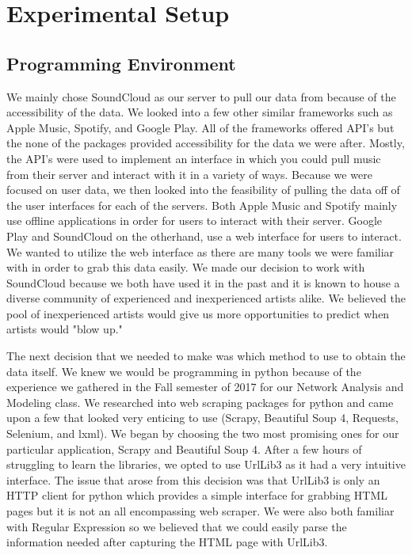 \documentclass{article}
\begin{document}
\section{Experimental Setup}
\subsection{Programming Environment}
We mainly chose SoundCloud as our server to pull our data from because of the accessibility of the data.  We looked into a few other similar frameworks such as Apple Music, Spotify, and Google Play.  All of the frameworks offered API's but the none of the packages provided accessibility for the data we were after.  Mostly, the API's were used to implement an interface in which you could pull music from their server and interact with it in a variety of ways.  Because we were focused on user data, we then looked into the feasibility of pulling the data off of the user interfaces for each of the servers.  Both Apple Music and Spotify mainly use offline applications in order for users to interact with their server.  Google Play and SoundCloud on the otherhand, use a web interface for users to interact.  We wanted to utilize the web interface as there are many tools we were familiar with in order to grab this data easily.  We made our decision to work with SoundCloud because we both have used it in the past and it is known to house a diverse community of experienced and inexperienced artists alike. We believed the pool of inexperienced artists would give us more opportunities to predict when artists would "blow up." 

The next decision that we needed to make was which method to use to obtain the data itself.  We knew we would be programming in python because of the experience we gathered in the Fall semester of 2017 for our Network Analysis and Modeling class.  We researched into web scraping packages for python and came upon a few that looked very enticing to use (Scrapy, Beautiful Soup 4, Requests, Selenium, and lxml).  We began by choosing the two most promising ones for our particular application, Scrapy and Beautiful Soup 4.  After a few hours of struggling to learn the libraries, we opted to use UrlLib3 as it had a very intuitive interface.  The issue that arose from this decision was that UrlLib3 is only an HTTP client for python which provides a simple interface for grabbing HTML pages but it is not an all encompassing web scraper.  We were also both familiar with Regular Expression so we believed that we could easily parse the information needed after capturing the HTML page with UrlLib3.
\end{document}

